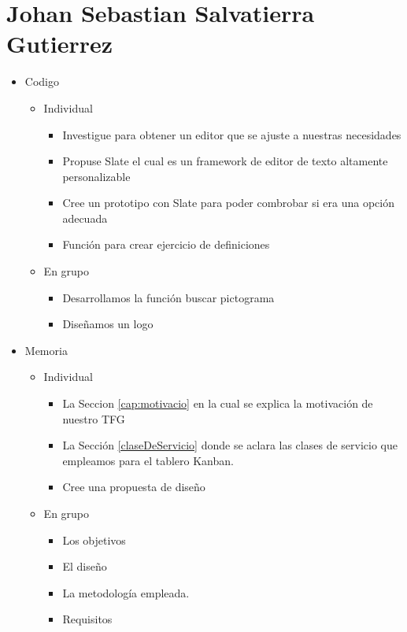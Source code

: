 \section{Johan Sebastian Salvatierra Gutierrez}
\begin{itemize}
    \item Codigo
        \begin{itemize}
            \item Individual
                \begin{itemize}
                    \item Investigue para obtener un editor que se ajuste a nuestras necesidades
                    \item Propuse Slate el cual es un framework de editor de texto altamente personalizable 
                    \item Cree un prototipo con Slate para poder combrobar si era una opción adecuada
                    \item Función para crear ejercicio de definiciones
                \end{itemize}
            \item En grupo
                \begin{itemize}
                    \item Desarrollamos la función buscar pictograma
                    \item Diseñamos un logo
                \end{itemize}
        \end{itemize}
    \item Memoria
    \begin{itemize}
        \item Individual
            \begin{itemize}
                \item La Seccion \ref{cap:motivacio} en la cual se explica la motivación de nuestro TFG
                \item La Sección \ref{claseDeServicio} donde se aclara las clases de servicio que empleamos para el tablero Kanban.
                \item Cree una propuesta de diseño
            \end{itemize}
        \item En grupo
            \begin{itemize}
                \item Los objetivos
                \item El diseño 
                \item La metodología empleada.
                \item Requisitos
            \end{itemize}
    \end{itemize}
\end{itemize}